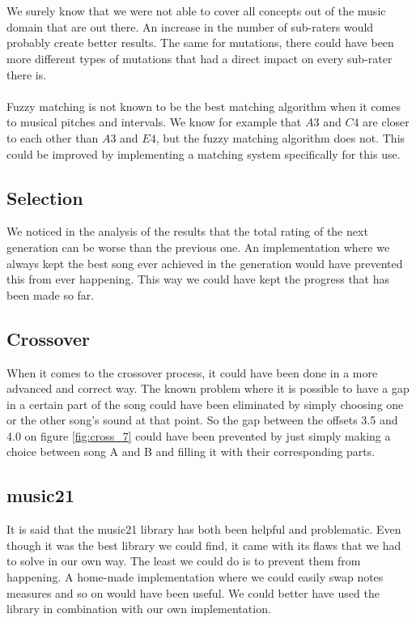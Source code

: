 \documentclass[a4paper]{article}
\begin{document}
\\\\
We surely know that we were not able to cover all concepts out of the music domain that are out there. An increase in the number of sub-raters would probably create better results. The same for mutations, there could have been more different types of mutations that had a direct impact on every sub-rater there is.
\\\\
Fuzzy matching is not known to be the best matching algorithm when it comes to musical pitches and intervals. We know for example that $A3$ and $C4$ are closer to each other than $A3$ and $E4$, but the fuzzy matching algorithm does not. This could be improved by implementing a matching system specifically for this use.

\subsection{Selection}
We noticed in the analysis of the results that the total rating of the next generation can be worse than the previous one. An implementation where we always kept the best song ever achieved in the generation would have prevented this from ever happening. This way we could have kept the progress that has been made so far.

\subsection{Crossover}
When it comes to the crossover process, it could have been done in a more advanced and correct way. The known problem where it is possible to have a gap in a certain part of the song could have been eliminated by simply choosing one or the other song's sound at that point. So the gap between the offsets 3.5 and 4.0 on figure \ref{fig:cross_7} could have been prevented by just simply making a choice between song A and B and filling it with their corresponding parts.

\subsection{music21}
It is said that the music21 library has both been helpful and problematic. Even though it was the best library we could find, it came with its flaws that we had to solve in our own way. The least we could do is to prevent them from happening. A home-made implementation where we could easily swap notes measures and so on would have been useful. We could better have used the library in combination with our own implementation.
\end{document}
